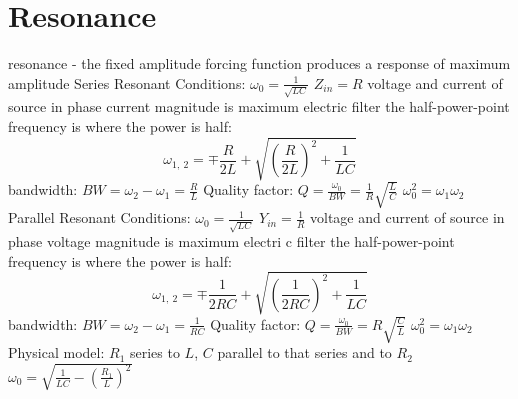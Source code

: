 \documentclass[a4paper,11pt]{article}
\begin{document}
	\section{Resonance}
	\begin{outline}[enumerate]
		\1 resonance - the fixed amplitude forcing function produces a response of maximum amplitude
		\1 Series Resonant Conditions:
			\2 $\omega_0 = \frac{1}{\sqrt{LC}}$
			\2 $Z_{in} = R$
			\2 voltage and current of source in phase 
			\2 current magnitude is maximum 
			\2 electric filter 
			\2 the half-power-point frequency is where the power is half: 
				\begin{equation}
					\omega_{1,~2} = \mp \frac{R}{2L} + \sqrt{\left( \frac{R}{2L} \right)^2 + \frac{1}{LC} }
				\end{equation}	
			\2 bandwidth: $BW = \omega_2 - \omega_1 = \frac{R}{L}$
			\2 Quality factor: $Q = \frac{\omega_0}{BW} = \frac{1}{R}\sqrt{\frac{L}{C}}$
			\2 $\omega_0^2 = \omega_1\omega_2$
		\1 Parallel Resonant Conditions:
			\2 $\omega_0 = \frac{1}{\sqrt{LC}}$
			\2 $Y_{in} = \frac{1}{R}$
			\2 voltage and current of source in phase 
			\2 voltage magnitude is maximum 
			\2 electri c filter 
			\2 the half-power-point frequency is where the power is half: 
			\begin{equation}
				\omega_{1,~2} = \mp \frac{1}{2RC} + \sqrt{\left( \frac{1}{2RC} \right)^2 + \frac{1}{LC} }
			\end{equation}	
			\2 bandwidth: $BW = \omega_2 - \omega_1 = \frac{1}{RC}$
			\2 Quality factor: $Q = \frac{\omega_0}{BW} = R\sqrt{\frac{C}{L}}$
			\2 $\omega_0^2 = \omega_1\omega_2$	
		\1 Physical model: $R_1$ series to $L$, $C$ parallel to that series and to $R_2$
			\2 $\omega_0 = \sqrt{\frac{1}{LC} - \left(\frac{R_1}{L} \right)^2 }$	
	\end{outline}

	\newpage
\end{document}
